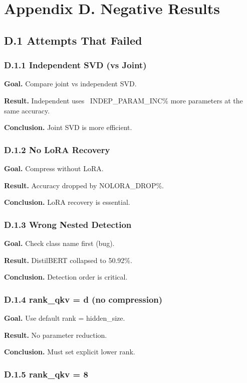 \section{Appendix D. Negative Results}

\subsection{D.1 Attempts That Failed}

\subsubsection{D.1.1 Independent SVD (vs Joint)}

\textbf{Goal.} Compare joint vs independent SVD.

\textbf{Result.} Independent uses ~{{INDEP\_PARAM\_INC}}\% more parameters at the 
same accuracy.

\textbf{Conclusion.} Joint SVD is more efficient.

\subsubsection{D.1.2 No LoRA Recovery}

\textbf{Goal.} Compress without LoRA.

\textbf{Result.} Accuracy dropped by {{NOLORA\_DROP}}\%.

\textbf{Conclusion.} LoRA recovery is essential.

\subsubsection{D.1.3 Wrong Nested Detection}

\textbf{Goal.} Check class name first (bug).

\textbf{Result.} DistilBERT collapsed to 50.92\%.

\textbf{Conclusion.} Detection order is critical.

\subsubsection{D.1.4 rank\_qkv = d (no compression)}

\textbf{Goal.} Use default rank = hidden\_size.

\textbf{Result.} No parameter reduction.

\textbf{Conclusion.} Must set explicit lower rank.

\subsubsection{D.1.5 rank\_qkv = 8}

